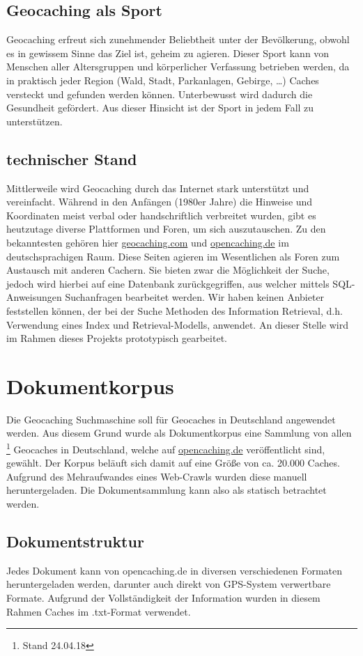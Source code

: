 \documentclass[11pt,a4paper]{scrreprt}
\begin{document}
\subsection{Geocaching als Sport}
Geocaching erfreut sich zunehmender Beliebtheit unter der Bevölkerung, obwohl es in gewissem Sinne das Ziel ist, geheim zu agieren. Dieser Sport kann von Menschen aller Altersgruppen und körperlicher Verfassung betrieben werden, da in praktisch jeder Region (Wald, Stadt, Parkanlagen, Gebirge, \dots) Caches versteckt und gefunden werden können. Unterbewusst wird dadurch die Gesundheit gefördert. Aus dieser Hinsicht ist der Sport in jedem Fall zu unterstützen. 

\subsection{technischer Stand}
Mittlerweile wird Geocaching durch das Internet stark unterstützt und vereinfacht. Während in den Anfängen (1980er Jahre) die Hinweise und Koordinaten meist verbal oder handschriftlich verbreitet wurden, gibt es heutzutage diverse Plattformen und Foren, um sich auszutauschen. Zu den bekanntesten gehören hier \href{geocaching.com}{geocaching.com} und \href{opencaching.de}{opencaching.de} im deutschsprachigen Raum. Diese Seiten agieren im Wesentlichen als Foren zum Austausch mit anderen Cachern. Sie bieten zwar die Möglichkeit der Suche, jedoch wird hierbei auf eine Datenbank zurückgegriffen, aus welcher mittels SQL-Anweisungen Suchanfragen bearbeitet werden. Wir haben keinen Anbieter feststellen können, der bei der Suche Methoden des Information Retrieval, d.h. Verwendung eines Index und Retrieval-Modells, anwendet. An dieser Stelle wird im Rahmen dieses Projekts prototypisch gearbeitet. 

\section{Dokumentkorpus}
Die Geocaching Suchmaschine soll für Geocaches in Deutschland angewendet werden. Aus diesem Grund wurde als Dokumentkorpus eine Sammlung von allen \footnote{Stand 24.04.18} Geocaches in Deutschland, welche auf \href{opencaching.de}{opencaching.de} veröffentlicht sind, gewählt. Der Korpus beläuft sich damit auf eine Größe von ca. 20.000 Caches. Aufgrund des Mehraufwandes eines Web-Crawls wurden diese manuell heruntergeladen. Die Dokumentsammlung kann also als statisch betrachtet werden. 

\subsection{Dokumentstruktur}
Jedes Dokument kann von opencaching.de in diversen verschiedenen Formaten heruntergeladen werden, darunter auch direkt von GPS-System verwertbare Formate. Aufgrund der Vollständigkeit der Information wurden in diesem Rahmen Caches im .txt-Format verwendet. 
\end{document}
